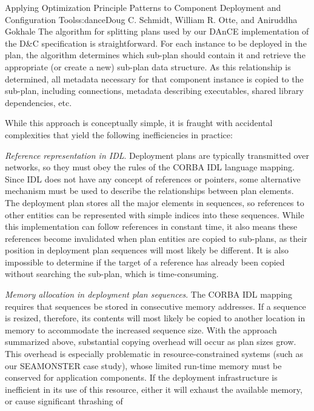 \begin{aosachapter}{Applying Optimization Principle Patterns to Component Deployment and
                    Configuration Tools}{s:dance}{Doug C. Schmidt, William R. Otte, and Aniruddha Gokhale}
The algorithm for splitting plans used by our DAnCE implementation of
the D\&C specification is straightforward. For each instance to be
deployed in the plan, the algorithm determines which sub-plan should
contain it and retrieve the appropriate (or create a new) sub-plan data
structure. As this relationship is determined, all metadata necessary
for that component instance is copied to the sub-plan, including
connections, metadata describing executables, shared library
dependencies, etc.


While this approach is conceptually simple, it is fraught with
accidental complexities that yield the following inefficiencies in
practice:

\begin{aosaenumerate}
\def\labelenumi{\arabic{enumi}.}
\item
  \emph{Reference representation in IDL}. Deployment plans are typically
  transmitted over networks, so they must obey the rules of the CORBA
  IDL language mapping. Since IDL does not have any concept of
  references or pointers, some alternative mechanism must be used to
  describe the relationships between plan elements. The deployment plan
  stores all the major elements in sequences, so references to other
  entities can be represented with simple indices into these sequences.
  While this implementation can follow references in constant time, it
  also means these references become invalidated when plan entities are
  copied to sub-plans, as their position in deployment plan sequences
  will most likely be different. It is also impossible to determine if
  the target of a reference has already been copied without searching
  the sub-plan, which is time-consuming.
\item
  \emph{Memory allocation in deployment plan sequences}. The CORBA IDL
  mapping requires that sequences be stored in consecutive memory
  addresses. If a sequence is resized, therefore, its contents will most
  likely be copied to another location in memory to accommodate the
  increased sequence size. With the approach summarized above,
  substantial copying overhead will occur as plan sizes grow. This
  overhead is especially problematic in resource-constrained systems
  (such as our SEAMONSTER case study), whose limited run-time memory
  must be conserved for application components. If the deployment
  infrastructure is inefficient in its use of this resource, either it
  will exhaust the available memory, or cause significant thrashing of

\end{aosaenumerate}
\end{aosachapter}
